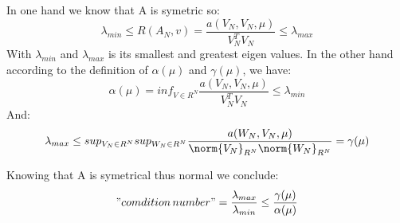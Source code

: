 In one hand we know that A is symetric so:
 $$ \lambda_{min} \leq R(A_N,v)  = \frac {a(V_N,V_N,\mu)} {V_N^T V_N} \leq \lambda_{max} $$
With $\lambda_{min}$ and $\lambda_{max}$ is its smallest and greatest eigen values.
In the other hand according to the definition of $\alpha(\mu)$ and $\gamma(\mu)$, we have:
$$\alpha(\mu) = inf_{V \in R^N} \frac {a(V_N,V_N,\mu)} {V_N^T V_N} \leq \lambda_{min}$$
And:
$$ \lambda_{max} \leq sup_{V_N \in R^N} sup_{W_N \in R^N} \frac {a(W_N,V_N,\mu)} {{\norm{V_N}}_{R^N} {\norm {W_N}}_{R^N}} = \gamma(\mu)$$

Knowing that A is symetrical thus normal we conclude:
$$ "comdition \, number" = \frac {\lambda_{max}}{\lambda_{min}} \leq \frac {\gamma(\mu)}{\alpha(\mu)} $$










